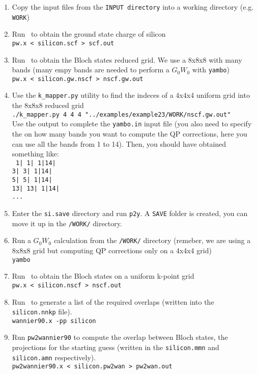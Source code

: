 \documentclass[a4paper,11pt,twoside]{article}
\begin{document}
\begin{enumerate}
\item Copy the input files from the {\tt INPUT directory} into a working directory (e.g. {\tt WORK})
\item Run \pwscf\ to obtain the ground state charge of silicon \\
{\tt pw.x < silicon.scf > scf.out}
\item Run \pwscf\ to obtain the Bloch states reduced grid. We use a 8x8x8 with many bands (many empy bands are needed to perform a $G_0W_0$ with {\tt yambo})\\
{\tt pw.x < silicon.gw.nscf > nscf.gw.out}
\item Use the {\tt k\_mapper.py} utility to find the indeces of a 4x4x4 uniform grid into the 8x8x8 reduced grid \\
{\tt ./k\_mapper.py 4 4 4 "../examples/example23/WORK/nscf.gw.out"}\\
Use the output to complete the {\tt yambo.in} input file (you also need to specify the on how many bands you want to compute the QP corrections, here you can use all the bands from 1 to 14). Then, you should have obtained something like:\\
 {\tt 
1| 1|  1|14| \\
3| 3|  1|14| \\ 
5| 5|  1|14| \\ 
13| 13|  1|14| \\
...\tt}
\item Enter the {\tt si.save} directory and run {\tt p2y}. A {\tt SAVE} folder is created, you can move it up in the {\tt /WORK/} directory.\\
\item Run a $G_0W_0$ calculation from the {\tt /WORK/} directory (remeber, we are using a 8x8x8 grid but computing QP corrections only on a 4x4x4 grid)\\
{\tt yambo }


\item Run \pwscf\ to obtain the Bloch states on a uniform k-point grid\\
{\tt pw.x < silicon.nscf > nscf.out}

\item Run \wannier\ to generate a list of the required overlaps (written
  into the {\tt silicon.nnkp} file).\\ 
{\tt wannier90.x -pp silicon}

\item Run {\tt pw2wannier90} to compute the overlap between Bloch
  states, the projections for the starting guess (written in the
  {\tt silicon.mmn} and {\tt silicon.amn} respectively).\\  
{\tt pw2wannier90.x < silicon.pw2wan > pw2wan.out}


\end{enumerate}
\end{document}
